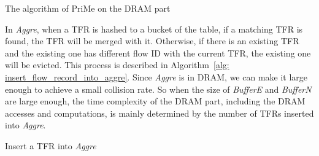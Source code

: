 \documentclass[10pt, conference, letterpaper]{IEEEtran}
\begin{document}
\begin{algorithm}[ht!]
	\caption{The algorithm of PriMe on the DRAM part}
	\label{alg: DRAM_part_algorithm}
	\algrenewcommand{}
	\begin{algorithmic}[1]
		\State{\Return}
		\EndIf
		\EndIf
		\EndFor
		\EndIf
	\end{algorithmic}
\end{algorithm}

In \emph{Aggre}, when a TFR is hashed to a bucket of the table, if a matching TFR is found, the TFR will be merged with it. Otherwise, if there is an existing TFR and the existing one has different flow ID with the current TFR, the existing one will be evicted. This process is described in Algorithm~\ref{alg: insert_flow_record_into_aggre}. Since \emph{Aggre} is in DRAM, we can make it large enough to achieve a small collision rate. So when the size of \emph{BufferE} and \emph{BufferN} are large enough, the time complexity of the DRAM part, including the DRAM accesses and computations, is mainly determined by the number of TFRs inserted into \emph{Aggre}.

\begin{algorithm}[ht!]
	\caption{Insert a TFR into \emph{Aggre}}
	\label{alg: insert_flow_record_into_aggre}
	\algrenewcommand{}
	\begin{algorithmic}[1]
		\Else
		\EndIf
		\EndProcedure	
	\end{algorithmic}
\end{algorithm}
\end{document}
